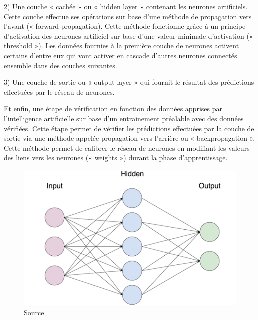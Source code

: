 \documentclass[a4paper,12pt]{article} %
\begin{document}
2)	Une couche « cachée » ou « hidden layer » contenant les neurones artificiels. Cette couche effectue ses opérations sur base d’une méthode de propagation vers l’avant (« forward propagation). Cette méthode fonctionne grâce à un principe d’activation des neurones artificiel sur base d’une valeur minimale d’activation (« threshold »). Les données fournies à la première couche de neurones activent certains d’entre eux qui vont activer en cascade d’autres neurones connectés ensemble dans des couches suivantes.\newline

3)	Une couche de sortie ou « output layer » qui fournit le résultat des prédictions effectuées par le réseau de neurones. \newline

Et enfin, une étape de vérification en fonction des données apprises par l’intelligence artificielle sur base d’un entrainement préalable avec des données vérifiées. Cette étape permet de vérifier les prédictions effectuées par la couche de sortie via une méthode appelée propagation vers l’arrière ou « backpropagation ». Cette méthode permet de calibrer le réseau de neurones en modifiant les valeurs des liens vers les neurones (« weights ») durant la phase d’apprentissage. \newline
\begin{figure}[h] %
  \centering %
  \includegraphics[scale=0.30]{ANN.png} %
  \caption{\href{https://towardsdatascience.com/step-by-step-guide-to-building-your-own-neural-network-from-scratch-df64b1c5ab6e}{Source} }
\end{figure}
\end{document}
